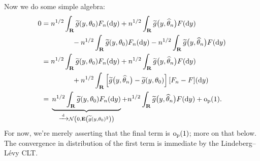 \documentclass[11pt,letterpaper,reqno,oneside]{article}
\begin{document}
Now we do some simple algebra:
%
\begin{align*}
	0 
	={}& n^{1/2} \int_{\mathbf{R}} \widetilde{g}( y, \theta_0 ) F_n(\mathrm{d} y)
	+ n^{1/2} \int_{\mathbf{R}} \widetilde{g}\bigl( y, \widehat{\theta}_n \bigr) F(\mathrm{d} y)
	\\&\quad\quad\quad
	- n^{1/2} \int_{\mathbf{R}} \widetilde{g}( y, \theta_0 ) F_n(\mathrm{d} y)
	- n^{1/2} \int_{\mathbf{R}} \widetilde{g}\bigl( y, \widehat{\theta}_n \bigr) F(\mathrm{d} y)
	\\
	={}& n^{1/2} \int_{\mathbf{R}} \widetilde{g}( y, \theta_0 ) F_n(\mathrm{d} y)
	+ n^{1/2} \int_{\mathbf{R}} \widetilde{g}\bigl( y, \widehat{\theta}_n \bigr) F(\mathrm{d} y)
	\\&\quad\quad\quad
	+ n^{1/2} \int_{\mathbf{R}} 
	\left[ \widetilde{g}\bigl( y, \widehat{\theta}_n \bigr) - \widetilde{g}( y, \theta_0 ) \right] [F_n-F](\mathrm{d} y)
	\\
	={}& \underbrace{ n^{1/2} \int_{\mathbf{R}} \widetilde{g}( y, \theta_0 ) F_n(\mathrm{d} y) 
	}_{ \xrightarrow{{\scriptscriptstyle \mathrm{\;d\;}}} \mathcal{N}\left( 0, 
	\mathbf{E}\left( \widetilde{g}( y, \theta_0 )^2 \right) \right) }
	+ n^{1/2} \int_{\mathbf{R}} \widetilde{g}\bigl( y, \widehat{\theta}_n \bigr) F(\mathrm{d} y)
	+ \mathrm{o}_{\mathrm{p}}(1) .
\end{align*}
%
For now, we're merely asserting that the final term is $\mathrm{o}_{\mathrm{p}}(1)$; more on that below. The convergence in distribution of the first term is immediate by the Lindeberg--Lévy CLT.
\end{document}
